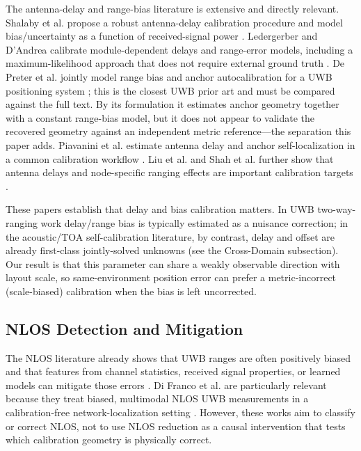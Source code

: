 \documentclass[11pt,a4paper]{article}
\begin{document}
The antenna-delay and range-bias literature is extensive and directly relevant. Shalaby et al. propose a robust antenna-delay calibration procedure and model bias/uncertainty as a function of received-signal power \citep{shalaby_2023_calibration_and_uncertainty_char}. Ledergerber and D'Andrea calibrate module-dependent delays and range-error models, including a maximum-likelihood approach that does not require external ground truth \citep{ledergerber_2018_calibrating_away_inaccuracies_uwb}. De Preter et al. jointly model range bias and anchor autocalibration for a UWB positioning system \citep{de_preter_2019_range_bias_modeling_autocalibration}; this is the closest UWB prior art and must be compared against the full text. By its formulation it estimates anchor geometry together with a constant range-bias model, but it does not appear to validate the recovered geometry against an independent metric reference---the separation this paper adds. Piavanini et al. estimate antenna delay and anchor self-localization in a common calibration workflow \citep{piavanini_2022_a_calibration_method_for}. Liu et al. and Shah et al. further show that antenna delays and node-specific ranging effects are important calibration targets \citep{liu_2024_data_driven_antenna_delay_calibr,shah_2021_antenna_delay_calibration_of,shah_2022_node_calibration_in_uwb_based}.

These papers establish that delay and bias calibration matters. In UWB two-way-ranging work delay/range bias is typically estimated as a nuisance correction; in the acoustic/TOA self-calibration literature, by contrast, delay and offset are already first-class jointly-solved unknowns (see the Cross-Domain subsection). Our result is that this parameter can share a weakly observable direction with layout scale, so same-environment position error can prefer a metric-incorrect (scale-biased) calibration when the bias is left uncorrected.

\subsection{NLOS Detection and Mitigation}

The NLOS literature already shows that UWB ranges are often positively biased and that features from channel statistics, received signal properties, or learned models can mitigate those errors \citep{maran_2010_nlos_identification_and_mitigati,wymeersch_2012_a_machine_learning_approach,guven_2007_nlos_identification_and_weight,venkatesh_2007_non_line_of_sight_identification,meghani_2019_empirical_based_ranging_error,jeong_2023_hybrid_quantum_convolutional_neu,kong_2023_nlos_identification_for_uwb,sung_2023_accurate_indoor_positioning_for,yang_2024_uwb_nlos_identification_and}. Di Franco et al. are particularly relevant because they treat biased, multimodal NLOS UWB measurements in a calibration-free network-localization setting \citep{difranco_2017_calibration_free_network_localization_nlos_uwb}. However, these works aim to classify or correct NLOS, not to use NLOS reduction as a causal intervention that tests which calibration geometry is physically correct.
\end{document}
